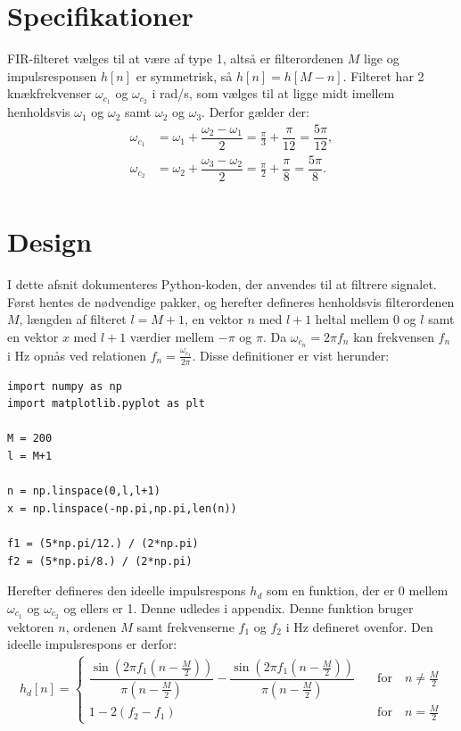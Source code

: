 \section{Specifikationer}
FIR-filteret vælges til at være af type 1, altså er filterordenen $M$ lige og impulsresponsen $h[n]$ er symmetrisk, så $h[n] = h[M - n]$. Filteret har 2 knækfrekvenser $\omega_{c_1}$ og $\omega_{c_2}$ i rad/s, som vælges til at ligge midt imellem henholdsvis $\omega_1$ og $\omega_2$ samt $\omega_2$ og $\omega_3$. Derfor gælder der:
\begin{align*}
\omega_{c_1} &= \omega_1 + \dfrac{\omega_2 - \omega_1}{2} = \frac{\pi}{3} + \dfrac{\pi}{12} = \dfrac{5\pi}{12}, \\
\omega_{c_2} &= \omega_2 + \dfrac{\omega_3 - \omega_2}{2} = \frac{\pi}{2} + \dfrac{\pi}{8} = \dfrac{5\pi}{8}. \\
\end{align*}

\section{Design} \label{ch4_design}
I dette afsnit dokumenteres Python-koden, der anvendes til at filtrere signalet. Først hentes de nødvendige pakker, og herefter defineres henholdsvis filterordenen $M$, længden af filteret $l = M + 1$, en vektor $n$ med $l+1$ heltal mellem 0 og $l$ samt en vektor $x$ med $l+1$ værdier mellem $-\pi$ og $\pi$. Da $\omega_{c_n} = 2\pi f_n$ kan frekvensen $f_n$ i Hz opnås ved relationen $f_n = \frac{\omega_{c_1}}{2\pi}$. Disse definitioner er vist herunder:
\begin{lstlisting}
import numpy as np
import matplotlib.pyplot as plt

M = 200
l = M+1

n = np.linspace(0,l,l+1)
x = np.linspace(-np.pi,np.pi,len(n))

f1 = (5*np.pi/12.) / (2*np.pi)
f2 = (5*np.pi/8.) / (2*np.pi)
\end{lstlisting}

Herefter defineres den ideelle impulsrespons $h_d$ som en funktion, der er 0 mellem $\omega_{c_1}$ og $\omega_{c_2}$ og ellers er 1. Denne udledes i appendix. Denne funktion bruger vektoren $n$, ordenen $M$ samt frekvenserne $f_1$ og $f_2$ i Hz defineret ovenfor. Den ideelle impulsrespons er derfor:
\begin{align*}
h_d[n] = \begin{cases} \dfrac{\sin\left(2 \pi f_1\left(n - \frac{M}{2}\right)\right)}{\pi\left(n - \frac{M}{2}\right)} - \dfrac{\sin\left(2\pi f_1\left(n - \frac{M}{2}\right)\right)}{\pi\left(n - \frac{M}{2}\right)} \quad &\text{for} \quad n \neq \frac{M}{2} \\
1 - 2(f_2 - f_1) \quad &\text{for} \quad n = \frac{M}{2}
\end{cases}
\end{align*}

